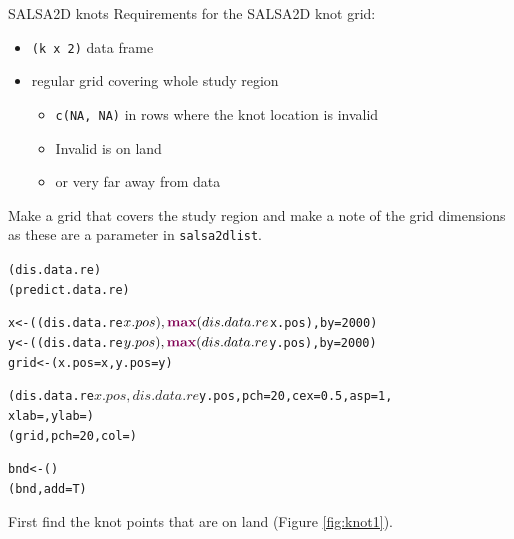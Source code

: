 \begin{block}{SALSA2D knots}
Requirements for the SALSA2D knot grid:
\begin{itemize}
\item {\tt (k x 2)} data frame
\item regular grid covering whole study region
\begin{itemize}
\item {\tt c(NA, NA)} in rows where the knot location is invalid
\item Invalid is on land 
\item or very far away from data
\end{itemize}
\end{itemize}
\end{block}

\noindent Make a grid that covers the study region and make a note of the grid dimensions as these are a parameter in {\tt salsa2dlist}.
\begin{knitrout}\footnotesize
{}\color{fgcolor}\begin{kframe}
\begin{alltt}
(dis.data.re)
(predict.data.re)

x<-((dis.data.re$x.pos), \hlfunctioncall{max}(dis.data.re$x.pos), by=2000)
y<-((dis.data.re$y.pos), \hlfunctioncall{max}(dis.data.re$y.pos), by=2000)
grid<-(x.pos=x, y.pos=y)

(dis.data.re$x.pos, dis.data.re$y.pos, pch=20, cex=0.5, asp=1, 
     xlab=, ylab=)
(grid, pch=20, col=)

bnd<-() 
(bnd, add=T)
\end{alltt}
\end{kframe}
\end{knitrout}

\noindent First find the knot points that are on land (Figure \ref{fig:knot1}).

